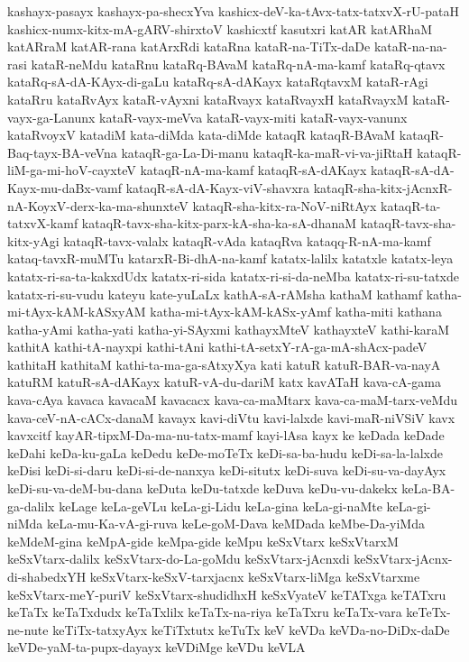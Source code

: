 {kashayx-pasayx
kashayx-pa-shecxYva
kashicx-deV-ka-tAvx-tatx-tatxvX-rU-pataH
kashicx-numx-kitx-mA-gARV-shirxtoV
kashicxtf
kasutxri
katAR
katARhaM
katARraM
katAR-rana
katArxRdi
kataRna
kataR-na-TiTx-daDe
kataR-na-na-rasi
kataR-neMdu
kataRnu
kataRq-BAvaM
kataRq-nA-ma-kamf
kataRq-qtavx
kataRq-sA-dA-KAyx-di-gaLu
kataRq-sA-dAKayx
kataRqtavxM
kataR-rAgi
kataRru
kataRvAyx
kataR-vAyxni
kataRvayx
kataRvayxH
kataRvayxM
kataR-vayx-ga-Lanunx
kataR-vayx-meVva
kataR-vayx-miti
kataR-vayx-vanunx
kataRvoyxV
katadiM
kata-diMda
kata-diMde
kataqR
kataqR-BAvaM
kataqR-Baq-tayx-BA-veVna
kataqR-ga-La-Di-manu
kataqR-ka-maR-vi-va-jiRtaH
kataqR-liM-ga-mi-hoV-cayxteV
kataqR-nA-ma-kamf
kataqR-sA-dAKayx
kataqR-sA-dA-Kayx-mu-daBx-vamf
kataqR-sA-dA-Kayx-viV-shavxra
kataqR-sha-kitx-jAcnxR-nA-KoyxV-derx-ka-ma-shunxteV
kataqR-sha-kitx-ra-NoV-niRtAyx
kataqR-ta-tatxvX-kamf
kataqR-tavx-sha-kitx-parx-kA-sha-ka-sA-dhanaM
kataqR-tavx-sha-kitx-yAgi
kataqR-tavx-valalx
kataqR-vAda
kataqRva
kataqq-R-nA-ma-kamf
kataq-tavxR-muMTu
katarxR-Bi-dhA-na-kamf
katatx-lalilx
katatxle
katatx-leya
katatx-ri-sa-ta-kakxdUdx
katatx-ri-sida
katatx-ri-si-da-neMba
katatx-ri-su-tatxde
katatx-ri-su-vudu
kateyu
kate-yuLaLx
kathA-sA-rAMsha
kathaM
kathamf
katha-mi-tAyx-kAM-kASxyAM
katha-mi-tAyx-kAM-kASx-yAmf
katha-miti
kathana
katha-yAmi
katha-yati
katha-yi-SAyxmi
kathayxMteV
kathayxteV
kathi-karaM
kathitA
kathi-tA-nayxpi
kathi-tAni
kathi-tA-setxY-rA-ga-mA-shAcx-padeV
kathitaH
kathitaM
kathi-ta-ma-ga-sAtxyXya
kati
katuR
katuR-BAR-va-nayA
katuRM
katuR-sA-dAKayx
katuR-vA-du-dariM
katx
kavATaH
kava-cA-gama
kava-cAya
kavaca
kavacaM
kavacacx
kava-ca-maMtarx
kava-ca-maM-tarx-veMdu
kava-ceV-nA-cACx-danaM
kavayx
kavi-diVtu
kavi-lalxde
kavi-maR-niVSiV
kavx
kavxcitf
kayAR-tipxM-Da-ma-nu-tatx-mamf
kayi-lAsa
kayx
ke
keDada
keDade
keDahi
keDa-ku-gaLa
keDedu
keDe-moTeTx
keDi-sa-ba-hudu
keDi-sa-la-lalxde
keDisi
keDi-si-daru
keDi-si-de-nanxya
keDi-situtx
keDi-suva
keDi-su-va-dayAyx
keDi-su-va-deM-bu-dana
keDuta
keDu-tatxde
keDuva
keDu-vu-dakekx
keLa-BA-ga-dalilx
keLage
keLa-geVLu
keLa-gi-Lidu
keLa-gina
keLa-gi-naMte
keLa-gi-niMda
keLa-mu-Ka-vA-gi-ruva
keLe-goM-Dava
keMDada
keMbe-Da-yiMda
keMdeM-gina
keMpA-gide
keMpa-gide
keMpu
keSxVtarx
keSxVtarxM
keSxVtarx-dalilx
keSxVtarx-do-La-goMdu
keSxVtarx-jAcnxdi
keSxVtarx-jAcnx-di-shabedxYH
keSxVtarx-keSxV-tarxjacnx
keSxVtarx-liMga
keSxVtarxme
keSxVtarx-meY-puriV
keSxVtarx-shudidhxH
keSxVyateV
keTATxga
keTATxru
keTaTx
keTaTxdudx
keTaTxlilx
keTaTx-na-riya
keTaTxru
keTaTx-vara
keTeTx-ne-nute
keTiTx-tatxyAyx
keTiTxtutx
keTuTx
keV
keVDa
keVDa-no-DiDx-daDe
keVDe-yaM-ta-pupx-dayayx
keVDiMge
keVDu
keVLA
}
